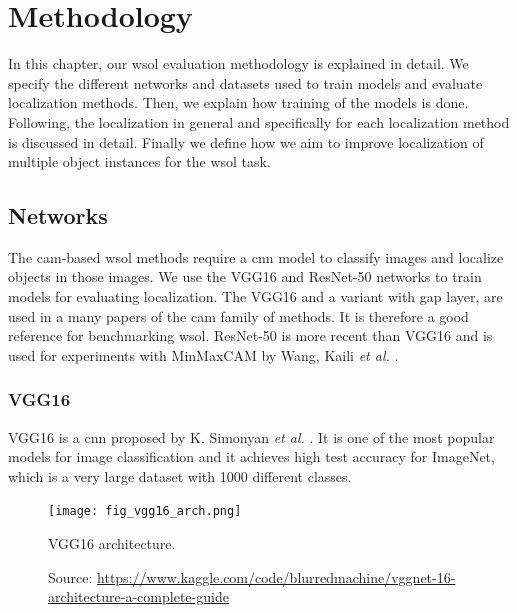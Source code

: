 \chapter{Methodology} \label{ch:methodology}

In this chapter, our \acrshort{wsol} evaluation methodology is explained in detail. We specify the different networks and datasets used to train models and evaluate localization methods. Then, we explain how training of the models is done. Following, the localization in general and specifically for each localization method is discussed in detail. Finally we define how we aim to improve localization of multiple object instances for the \acrshort{wsol} task.

\section{Networks}
The \acrshort{cam}-based \acrshort{wsol} methods require a \acrshort{cnn} model to classify images and localize objects in those images. We use the VGG16 and ResNet-50 networks to train models for evaluating localization. The VGG16 and a variant with \acrshort{gap} layer, are used in a many papers \cite{zhou2016cvpr, selvaraju2017grad, chattopadhyay2017grad, wang2020score, wang2021minmaxcam} of the \acrshort{cam} family of methods. It is therefore a good reference for benchmarking \acrshort{wsol}. ResNet-50 is more recent than VGG16 and is used for experiments with MinMaxCAM by Wang, Kaili \textit{et al.} \cite{wang2021minmaxcam}.

\subsection{VGG16}
VGG16 is a \acrshort{cnn} proposed by K. Simonyan \textit{et al.} \cite{simonyan2014very}. It is one of the most popular models for image classification and it achieves high test accuracy for ImageNet, which is a very large dataset with 1000 different classes.
\begin{figure}[ht]
    \begin{center}       
    \texttt{[image: fig\_vgg16\_arch.png]}
    \caption[VGG16 architecture]{VGG16 architecture.}
    \caption*{Source: \href{https://www.kaggle.com/code/blurredmachine/vggnet-16-architecture-a-complete-guide}{https://www.kaggle.com/code/blurredmachine/vggnet-16-architecture-a-complete-guide}}
    \label{fig:vgg16_arch}
    \end{center}
\end{figure}

